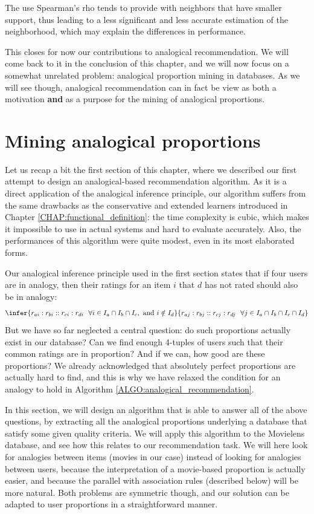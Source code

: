The use Spearman's rho tends to provide with neighbors that have smaller
support, thus leading to a less significant and less accurate estimation of the
neighborhood, which may explain the differences in performance.

This closes for now our contributions to analogical recommendation. We will
come back to it in the conclusion of this chapter, and we will now focus on a
somewhat unrelated problem: analogical proportion mining in databases. As we
will see though, analogical recommendation can in fact be view as both a
motivation \textbf{and} as a purpose for the mining of analogical proportions.

\section{Mining analogical proportions}
\label{SEC:mining_analogical_proportions}

Let us recap a bit the first section of this chapter, where we described our
first attempt to design an analogical-based recommendation algorithm. As it is
a direct application of the analogical inference principle, our algorithm
suffers from the same drawbacks as the conservative and extended learners
introduced in Chapter \ref{CHAP:functional_definition}: the time complexity is
cubic, which makes it impossible to use in actual systems and hard to evaluate
accurately. Also, the performances of this algorithm were quite modest, even in
its most elaborated forms.

Our analogical inference principle used in the first section states that if four users are in analogy,
then their ratings for an item $i$ that $d$ has not rated should also be in
analogy:
$$
\infer{ r_{ai} : r_{bi} :: r_{ci} : r_{di} ~~ \forall i \in I_a \cap I_b \cap
I_c, \text{ and } i\notin I_d }{r_{aj} : r_{bj} :: r_{cj} : r_{dj} ~~ \forall j
\in I_a \cap I_b \cap I_c \cap  I_d}
$$
But we have so far neglected a central question: do such proportions actually
exist in our database? Can we find enough 4-tuples of users such that their
common ratings are in proportion? And if we can, how good are these proportions? We already
acknowledged that absolutely perfect proportions are actually hard to find, and
this is why we have relaxed the condition for an analogy to hold in Algorithm
\ref{ALGO:analogical_recommendation}.

In this section, we will design an algorithm that is able to answer all of
the above questions, by extracting all the analogical proportions underlying a
database that satisfy some given quality criteria. We will apply this algorithm
to the Movielens database, and see how this relates to our recommendation task.
We will here look for analogies between items (movies in our case) instead of
looking for analogies between users, because the interpretation of a
movie-based proportion is actually easier, and because the parallel with
association rules (described below) will be more natural. Both problems are
symmetric though, and our solution can be adapted to user proportions in a
straightforward manner.

